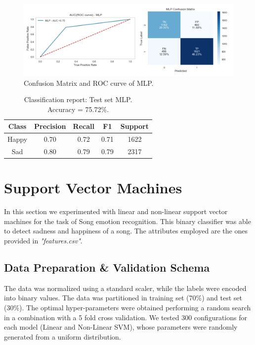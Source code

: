 \begin{figure}[!htb]
  \centering
  \includegraphics[width=0.7\linewidth]{images/MLP-confusion-matrix_ROC-curve_.png}
  \caption{Confusion Matrix and ROC curve of MLP.}
\end{figure}


\begin{table}[!htb]
\centering
\begin{tabular}{ccccc}
\hline
\textbf{Class} & \textbf{Precision} & \textbf{Recall} & \textbf{F1} & \textbf{Support} \\ \hline
Happy          & 0.70               & 0.72            & 0.71        & 1622             \\ \hline
Sad            & 0.80               & 0.79            & 0.79        & 2317            
\end{tabular}
\caption{Classification report: Test set MLP.\\ Accuracy = 75.72\%. }
\label{Classification report: Test set Linear SVM}
\end{table}







\section{Support Vector Machines}
In this section we experimented with linear and non-linear support vector machines for the task of Song emotion recognition. This binary classifier was able to detect sadness and happiness of a song.
The attributes employed are the ones provided in \textit{"features.csv"}.

\subsection{Data Preparation \& Validation Schema}
The data was normalized using a standard scaler, while the labels were encoded into binary values.  The data was partitioned in training set (70\%) and test set (30\%). 
The optimal hyper-parameters were obtained performing a random search in a combination with a 5 fold cross validation. We tested 300 configurations for each model (Linear and Non-Linear SVM), whose parameters were randomly generated from a uniform distribution.


